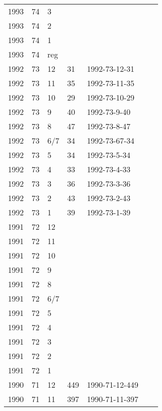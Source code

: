 \begin{longtable}{ |l|l|l|l|p{2.7cm}|l|p{2cm}| }
 1993 & 74 &     3 &         &                &  & \\
 1993 & 74 &     2 &         &                &  & \\
 1993 & 74 &     1 &         &                &  & \\
 1993 & 74 &   reg &         &                &  & \\
 1992 & 73 &    12 &     31  & 1992-73-12-31  &  & \\
 1992 & 73 &    11 &   35    & 1992-73-11-35  &  & \\
 1992 & 73 &    10 &   29    & 1992-73-10-29  &  & \\
 1992 & 73 &     9 &   40    & 1992-73-9-40   &  & \\
 1992 & 73 &     8 &    47   & 1992-73-8-47   &  & \\
 1992 & 73 &   6/7 &    34   &  1992-73-67-34 &  & \\
 1992 & 73 &     5 &      34 &  1992-73-5-34  &  & \\
 1992 & 73 &     4 &     33  &  1992-73-4-33  &  & \\
 1992 & 73 &     3 &    36   &  1992-73-3-36  &  & \\
 1992 & 73 &     2 &    43   & 1992-73-2-43   &  & \\
 1992 & 73 &     1 &     39  & 1992-73-1-39   &  & \\
 1991 & 72 &    12 &         &                &  & \\
 1991 & 72 &    11 &         &                &  & \\
 1991 & 72 &    10 &         &                &  & \\
 1991 & 72 &     9 &         &                &  & \\
 1991 & 72 &     8 &         &                &  & \\
 1991 & 72 &   6/7 &         &                &  & \\
 1991 & 72 &     5 &         &                &  & \\
 1991 & 72 &     4 &         &                &  & \\
 1991 & 72 &     3 &         &                &  & \\
 1991 & 72 &     2 &         &                &  & \\
 1991 & 72 &     1 &         &                &  & \\
 1990 & 71 &    12 &   449   & 1990-71-12-449 &  & \\
 1990 & 71 &    11 &    397  & 1990-71-11-397 &  & \\

\end{longtable}
